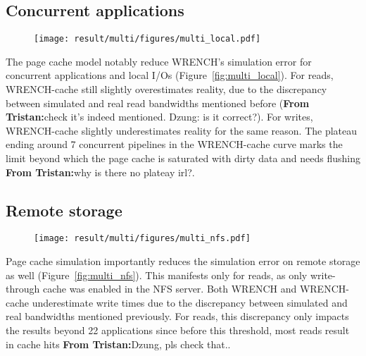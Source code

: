 \documentclass[conference]{IEEEtran}
\newcommand{\tristan}[1]{\color{orange}\textbf{From Tristan:}#1\color{black}}
\begin{document}
        \subsection{Concurrent applications}

            \begin{figure*}
            \begin{subfigure}{\linewidth}
                \centering
                \texttt{[image: result/multi/figures/multi\_local.pdf]}
            \end{subfigure}
            \caption{Concurrent results with 3~GB files (averages on 5 repetitions)}
            \label{fig:multi_local}
            \end{figure*}

            The page cache model notably reduce WRENCH's simulation error
            for concurrent applications and local I/Os
            (Figure~\ref{fig:multi_local}). For reads, WRENCH-cache still
            slightly overestimates reality, due to the discrepancy between
            simulated and real read bandwidths mentioned before
            (\tristan{check it's indeed mentioned. Dzung: is it correct?}). For writes, 
            WRENCH-cache slightly underestimates reality for the same reason. The plateau 
            ending around 7 concurrent pipelines in the WRENCH-cache curve
            marks the limit beyond which the page cache is saturated with dirty data 
            and needs flushing \tristan{why is there no plateay irl?}. 

        \subsection{Remote storage}

            \begin{figure*}
            \begin{subfigure}{\linewidth}
                \centering
                \texttt{[image: result/multi/figures/multi\_nfs.pdf]}
            \end{subfigure}
            \caption{NFS results with 3~GB files (averages on 5 repetitions)}
            \label{fig:multi_nfs}
            \end{figure*}

            Page cache simulation importantly reduces the simulation error
            on remote storage as well (Figure~\ref{fig:multi_nfs}). This
            manifests only for reads, as only write-through cache was
            enabled in the NFS server. Both WRENCH and WRENCH-cache
            underestimate write times due to the discrepancy between
            simulated and real bandwidths mentioned previously. For reads,
            this discrepancy only impacts the results beyond 22
            applications since before this threshold, most reads result in cache
            hits \tristan{Dzung, pls check that.}.
\end{document}
